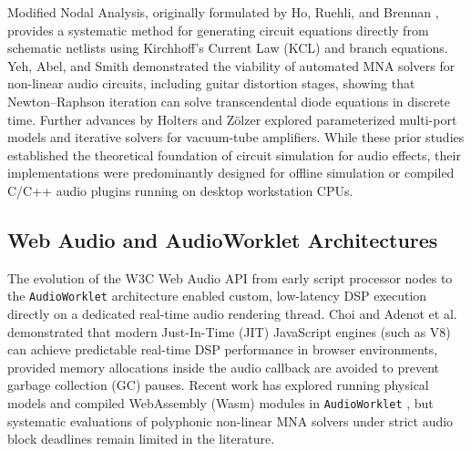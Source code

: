 \documentclass[fleqn,final]{jaes}
\begin{document}
Modified Nodal Analysis, originally formulated by Ho, Ruehli, and Brennan \cite{ho1975modified}, provides a systematic method for generating circuit equations directly from schematic netlists using Kirchhoff's Current Law (KCL) and branch equations. Yeh, Abel, and Smith \cite{yeh2007automated, yeh2009automated} demonstrated the viability of automated MNA solvers for non-linear audio circuits, including guitar distortion stages, showing that Newton--Raphson iteration can solve transcendental diode equations in discrete time. Further advances by Holters and Z\"olzer \cite{holters2011physical, holters2015combined} explored parameterized multi-port models and iterative solvers for vacuum-tube amplifiers. While these prior studies established the theoretical foundation of circuit simulation for audio effects, their implementations were predominantly designed for offline simulation or compiled C/C++ audio plugins running on desktop workstation CPUs.

\subsection{Web Audio and AudioWorklet Architectures}
The evolution of the W3C Web Audio API \cite{w3c2021webaudio} from early script processor nodes to the \texttt{AudioWorklet} architecture \cite{choi2018audioworklet} enabled custom, low-latency DSP execution directly on a dedicated real-time audio rendering thread. Choi \cite{choi2018highperformance} and Adenot et al. \cite{adenot2015webaudio} demonstrated that modern Just-In-Time (JIT) JavaScript engines (such as V8) can achieve predictable real-time DSP performance in browser environments, provided memory allocations inside the audio callback are avoided to prevent garbage collection (GC) pauses. Recent work has explored running physical models and compiled WebAssembly (Wasm) modules in \texttt{AudioWorklet} \cite{buffa2019webaudio}, but systematic evaluations of polyphonic non-linear MNA solvers under strict audio block deadlines remain limited in the literature.
\end{document}
